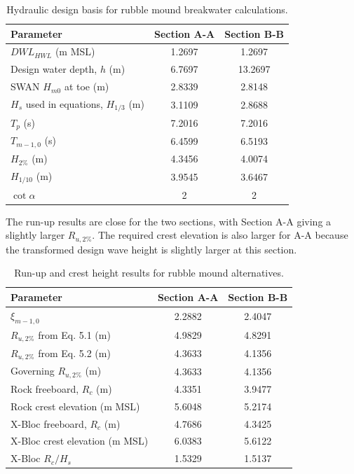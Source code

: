\documentclass[a4paper, 11pt]{article}
\begin{document}
\begin{table}[H]
\centering
\caption{Hydraulic design basis for rubble mound breakwater calculations.}
\label{tab:rmbw_hydraulic}
\begin{tabular}{l c c}
\hline
Parameter & Section A-A & Section B-B \\
\hline
\(DWL_{HWL}\) (m MSL) & 1.2697 & 1.2697 \\
Design water depth, \(h\) (m) & 6.7697 & 13.2697 \\
SWAN \(H_{m0}\) at toe (m) & 2.8339 & 2.8148 \\
\(H_s\) used in equations, \(H_{1/3}\) (m) & 3.1109 & 2.8688 \\
\(T_p\) (s) & 7.2016 & 7.2016 \\
\(T_{m-1,0}\) (s) & 6.4599 & 6.5193 \\
\(H_{2\%}\) (m) & 4.3456 & 4.0074 \\
\(H_{1/10}\) (m) & 3.9545 & 3.6467 \\
\(\cot\alpha\) & 2 & 2 \\
\hline
\end{tabular}
\end{table}

The run-up results are close for the two sections, with Section A-A giving a slightly larger \(R_{u,2\%}\). The required crest elevation is also larger for A-A because the transformed design wave height is slightly larger at this section.

\begin{table}[H]
\centering
\caption{Run-up and crest height results for rubble mound alternatives.}
\label{tab:rmbw_runup_crest}
\begin{tabular}{l c c}
\hline
Parameter & Section A-A & Section B-B \\
\hline
\(\xi_{m-1,0}\) & 2.2882 & 2.4047 \\
\(R_{u,2\%}\) from Eq. 5.1 (m) & 4.9829 & 4.8291 \\
\(R_{u,2\%}\) from Eq. 5.2 (m) & 4.3633 & 4.1356 \\
Governing \(R_{u,2\%}\) (m) & 4.3633 & 4.1356 \\
Rock freeboard, \(R_c\) (m) & 4.3351 & 3.9477 \\
Rock crest elevation (m MSL) & 5.6048 & 5.2174 \\
X-Bloc freeboard, \(R_c\) (m) & 4.7686 & 4.3425 \\
X-Bloc crest elevation (m MSL) & 6.0383 & 5.6122 \\
X-Bloc \(R_c/H_s\) & 1.5329 & 1.5137 \\
\hline
\end{tabular}
\end{table}
\end{document}
